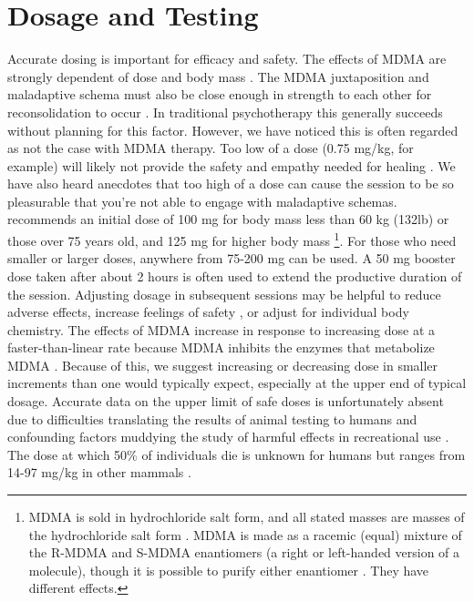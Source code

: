 \documentclass[12pt,letterpaper]{book}
\begin{document}
\section{Dosage and Testing}
\label{sec:dosing}
Accurate dosing is important for efficacy and safety. The effects of MDMA are strongly dependent of dose and body mass \cite{studerusResponse}. The MDMA juxtaposition and maladaptive schema must also be close enough in strength to each other for reconsolidation to occur \cite{eckerUnlocking}. In traditional psychotherapy this generally succeeds without planning for this factor. However, we have noticed this is often regarded as not the case with MDMA therapy. Too low of a dose (0.75 mg/kg, for example) will likely not provide the safety and empathy needed for healing \cite{bediMDMALowDose}. We have also heard anecdotes that too high of a dose can cause the session to be so pleasurable that you're not able to engage with maladaptive schemas. \textcite{liechtiInteractions} recommends an initial dose of 100 mg for body mass less than 60 kg (132lb) or those over 75 years old, and 125 mg for higher body mass \footnote{MDMA is sold in hydrochloride salt form, and all stated masses are masses of the hydrochloride salt form \cite{liechtiInteractions}. MDMA is made as a racemic (equal) mixture of the R-MDMA and S-MDMA enantiomers (a right or left-handed version of a molecule), though it is possible to purify either enantiomer \cite{straumann2024racemic}. They have different effects.}. For those who need smaller or larger doses, anywhere from 75-200 mg can be used. A 50 mg booster dose taken after about 2 hours is often used to extend the productive duration of the session. Adjusting dosage in subsequent sessions may be helpful to reduce adverse effects, increase feelings of safety \cite{regan2021Connection}, or adjust for individual body chemistry. The effects of MDMA increase in response to increasing dose at a faster-than-linear rate because MDMA inhibits the enzymes that metabolize MDMA \cite{de2000nonlinear}. Because of this, we suggest increasing or decreasing dose in smaller increments than one would typically expect, especially at the upper end of typical dosage. Accurate data on the upper limit of safe doses is unfortunately absent due to difficulties translating the results of animal testing to humans and confounding factors muddying the study of harmful effects in recreational use \cite{passieHistory}. The dose at which 50\% of individuals die is unknown for humans but ranges from 14-97 mg/kg in other mammals \cite{pharmalaInvestigatorBrochure}.
\end{document}
